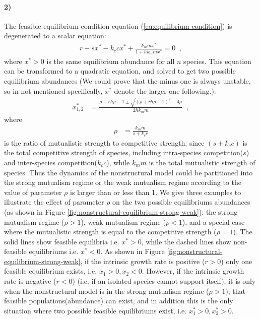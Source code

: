 \documentclass[a4paper,fleqn,12pt]{article}
\begin{document}
\paragraph*{2)} The feasible equilibrium condition equation (\ref{eq:equilibrium-condition}) is degenerated to a scalar equation:
\begin{align} \label{eq:equilibrium-condition-nonstructural}
r - sx^* - k_ccx^* + \frac{k_m m x^*}{1+hk_m m x^*} = 0 \;\;,
\end{align}
where $x^* > 0$ is the same equilibrium abundance for all $n$ species.
This equation can be transformed to a quadratic equation, and solved to get two possible equilibrium abundances (We could prove that the minus one is always unstable, so in not mentioned specifically, $x^*$ denote the larger one following.):
\begin{align} \label{eq:nonstructural-x1}
x^*_{1,2} &= \frac{\rho + rh\rho - 1 \pm \sqrt{(\rho+rh\rho+1)^2-4\rho}}{2hk_mm} \;\;,
\end{align}
where
\begin{align} \label{eq:rho}
\rho &= \frac{k_mm}{s+k_cc} 
\end{align}
is the ratio of mutualistic strength to competitive strength,
since $(s+k_cc)$ is the total competitive strength of species, including intra-species competition($s$) and inter-species competition($k_cc$), 
while $k_mm$ is the total mutualistic strength of species.
Thus the dynamics of the nonstructural model could be partitioned into the strong mutualism regime or the weak mutualism regime according to the value of parameter $\rho$ is larger than or less than 1\cite{bastolla_architecture_2009,saavedra_estimating_2013,rohr_structural_2014,suweis_emergence_2013}.
We give three examples to illustrate the effect of parameter $\rho$ on the two possible equilibriums abundances (as shown in Figure \ref{fig:nonstructural-equilibrium-strong-weak}):
the strong mutualism regime ($\rho > 1$), weak mutualism regime ($\rho < 1$), 
and a special case where the mutualistic strength is equal to the competitive strength ($\rho = 1$).
The solid lines show feasible equilibria i.e. $x^*>0$, while the dashed lines show non-feasible equilibriums i.e. $x^* < 0$.
As shown in Figure \ref{fig:nonstructural-equilibrium-strong-weak}, if the intrinsic growth rate is positive ($r>0$) only one feasible equilibrium exists, i.e. $x_1 > 0, x_2 < 0$.
However, if the
intrinsic growth rate is negative ($r<0$) (i.e. if an isolated species cannot support itself), it is 
only when the nonstructural model is in the strong mutualism regime ($\rho > 1$),
that feasible populations(abundance) can exist, and in addition this is the only situation where
two possible feasible equilibriums exist, i.e. $x^*_1 > 0, x^*_2 > 0$.
\end{document}
